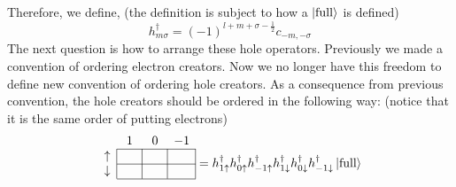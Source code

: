 %
Therefore, we define, (the definition is subject to how a $\Ket{\text{full}}$ is defined)
\begin{equation} \label{eq:ehtrans}
\boxed{
h_{m\sigma}^\dagger = (-1)^{l+m+\sigma-\frac{1}{2}} c_{-m,-\sigma}
}
\end{equation}
%
The next question is how to arrange these hole operators. Previously
we made a convention of ordering electron creators. Now we no longer
have this freedom to define new convention of ordering
hole creators. As a consequence from previous convention, the hole
creators should be ordered in the following way:
(notice that it is the same order of putting electrons)
\vspace{-0.5em}
\begin{equation}
\begin{array}{c|c|c|c|}
\multicolumn{1}{c}{} & \multicolumn{1}{c}{\phantom{,}1\phantom{,}} & \multicolumn{1}{c}{\phantom{,}0\phantom{,}} & \multicolumn{1}{c}{-1} \\ \cline{2-4}
\uparrow &  &  &  \\ \cline{2-4}
\downarrow &  &  &  \\
\cline{2-4}
\multicolumn{1}{c}{}
\end{array} =
h_{1\uparrow}^\dagger h_{0\uparrow}^\dagger h_{-1\uparrow}^\dagger
h_{1\downarrow}^\dagger h_{0\downarrow}^\dagger h_{-1\downarrow}^\dagger
\Ket{\text{full}}
\end{equation}

